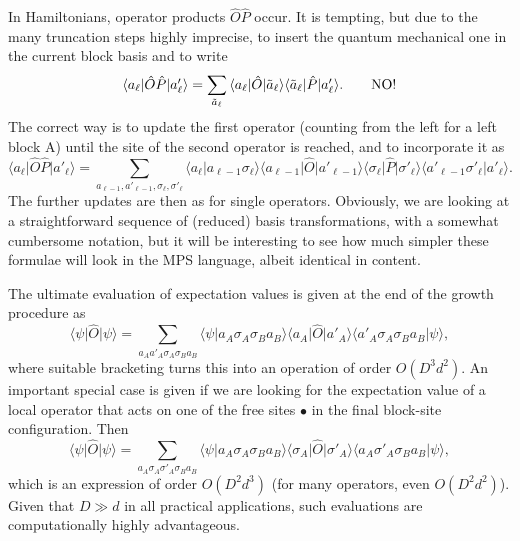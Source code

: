 \documentclass[a4paper,10pt,oneside,onecolumn,1p,times]{elsarticle}
\newcommand{\bra}[1]{\mbox{$\langle #1  |$}}
\newcommand{\ket}[1]{\mbox{$| #1  \rangle$}}
\newcommand{\braket}[2]{\mbox{$\langle #1  | #2 \rangle$}} 	%
\begin{document}
In Hamiltonians, operator products $\hat{O}\hat{P}$ occur. It is tempting, but due to the many truncation steps highly imprecise, to insert the quantum mechanical one in the current block basis and to write
\begin{equation}
\bra{a_\ell} \hat{O}\hat{P} \ket{a'_\ell} = \sum_{\tilde{a}_\ell} \bra{a_\ell} \hat{O} \ket{\tilde{a}_\ell} \bra{\tilde{a}_\ell} \hat{P} \ket{a'_\ell} . \quad\quad {\rm NO!}
\end{equation}
The correct way is to update the first operator (counting from the left for a left block A) until the site of the second operator is reached, and to incorporate it as
\begin{equation}
\bra{a_\ell} \hat{O} \hat{P} \ket{a'_\ell} = \sum_{a_{\ell-1},a'_{\ell-1},\sigma_\ell,\sigma'_\ell}
\braket{a_\ell}{a_{\ell-1}\sigma_\ell}  \bra{a_{\ell-1}} \hat{O} \ket{a'_{\ell-1}} \bra{\sigma_\ell} \hat{P} \ket{\sigma'_\ell} \braket{a'_{\ell-1}\sigma'_\ell}{a'_\ell} .
\label{eq:incorporate}
\end{equation}
The further updates are then as for single operators. Obviously, we are looking at a straightforward sequence of (reduced) basis transformations, with a somewhat cumbersome notation, but it will be interesting to see how much simpler these formulae will look in the MPS language, albeit identical in content.


The ultimate evaluation of expectation values is given at the end of the growth procedure as 
\begin{equation}
\bra{\psi} \hat{O} \ket{\psi} = \sum_{a_A a'_A \sigma_A \sigma_B a_B} \braket{\psi}{a_A \sigma_A \sigma_B a_B} \bra{a_A} \hat{O} \ket{a'_A} \braket{a'_A \sigma_A \sigma_B a_B}{\psi},
\end{equation}
where suitable bracketing turns this into an operation of order $O(D^3 d^2)$. An important special case is given if we are looking for the expectation value of a local operator that acts on one of the free sites $\bullet$ in the final block-site configuration. Then 
\begin{equation}
\bra{\psi} \hat{O} \ket{\psi} = \sum_{a_A \sigma_A \sigma'_A \sigma_B a_B} \braket{\psi}{a_A \sigma_A \sigma_B a_B} \bra{\sigma_A} \hat{O} \ket{\sigma'_A} \braket{a_A \sigma'_A \sigma_B a_B}{\psi},
\end{equation}
which is an expression of order $O(D^2 d^3)$ (for many operators, even $O(D^2 d^2)$). Given that $D \gg d$ in all practical applications, such evaluations are computationally highly advantageous.
\end{document}
